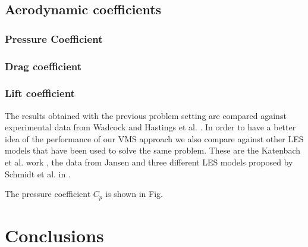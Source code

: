 \subsection{Aerodynamic coefficients}
\subsubsection{Pressure Coefficient}
\subsubsection{Drag coefficient}
\subsubsection{Lift coefficient}

The results obtained with the previous problem setting are compared against experimental data from Wadcock \cite{wadcock_investigation_1987} and Hastings et al. \cite{Hastings}. In order to have a better idea of the performance of our VMS approach we also compare against other LES models that have been used to solve the same problem. These are the Katenbach  et al. work \cite{kaltenbach_large-eddy_1995}, the data from Jansen \cite{jansen_stabilized_1999} and three different LES models proposed by Schmidt et al. in \cite{schmidt_assessment_????}.

The pressure coefficient $C_p$ is shown in Fig. 





\section{Conclusions}
\label{sec-C8_conclusions}
